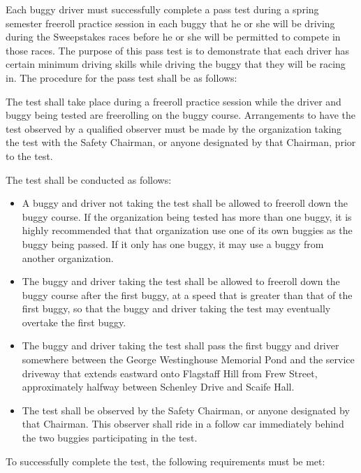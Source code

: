 	Each buggy driver must successfully complete a pass test during a spring semester freeroll practice session in each buggy that he or she will be driving during the Sweepstakes races before he or she will be permitted to compete in those races. The purpose of this pass test is to demonstrate that each driver has certain minimum driving skills while driving the buggy that they will be racing in. The procedure for the pass test shall be as follows:
	
	The test shall take place during a freeroll practice session while the driver and buggy being tested are freerolling on the buggy course. Arrangements to have the test observed by a qualified observer must be made by the organization taking the test with the Safety Chairman, or anyone designated by that Chairman, prior to the test.
	
	The test shall be conducted as follows:

	\begin{itemize}

		\item A buggy and driver not taking the test shall be allowed to freeroll down the buggy course. If the organization being tested has more than one buggy, it is highly recommended that that organization  use one of its own buggies as the buggy being passed. If it only has one buggy, it may use a buggy from another organization.

		\item The buggy and driver taking the test shall be allowed to freeroll down the buggy course after the first buggy, at a speed that is greater than that of the first buggy, so that the buggy and driver taking the test may eventually overtake the first buggy.

		\item The buggy and driver taking the test shall pass the first buggy and driver somewhere between the George Westinghouse Memorial Pond and the service driveway that extends eastward onto Flagstaff Hill from Frew Street, approximately halfway between Schenley Drive and Scaife Hall.

		\item The test shall be observed by the Safety Chairman, or anyone designated by that Chairman. This observer shall ride in a follow car immediately behind the two buggies participating in the test.

	\end{itemize}

	\noindent To successfully complete the test, the following requirements must be met:

